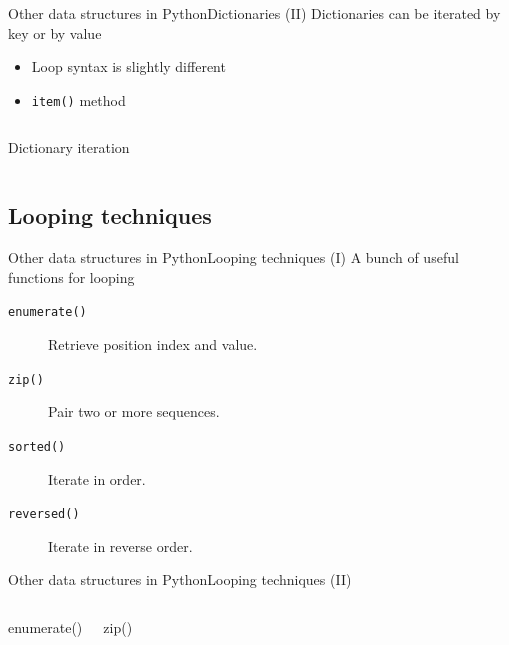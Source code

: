 \documentclass[10pt,compress]{beamer} %
\begin{document}
\begin{frame}{Other data structures in Python}{Dictionaries (II)}
	Dictionaries can be iterated by key or by value
		\begin{itemize}
		\item Loop syntax is slightly different
		\item \texttt{item()} method
		\end{itemize}

    \begin{columns}
		\begin{block}{Dictionary iteration}
		\vspace{-0.2cm}
		
		\vspace{-0.2cm}
		\end{block}
	\end{columns}
\end{frame}

\subsection{Looping techniques}
\begin{frame}{Other data structures in Python}{Looping techniques (I)}
	A bunch of useful functions for looping
		\begin{description}
		\item[\texttt{enumerate()}] Retrieve position index and value.
		\item[\texttt{zip()}] Pair two or more sequences.
		\item[\texttt{sorted()}] Iterate in order.
		\item[\texttt{reversed()}] Iterate in reverse order.
		\end{description}
\end{frame}

\begin{frame}{Other data structures in Python}{Looping techniques (II)}
    \begin{columns}
 	   \column{\textwidth}
		\begin{block}{enumerate()}
		\vspace{-0.2cm}
		
		\vspace{-0.2cm}
		\end{block}

		\begin{block}{zip()}
		\vspace{-0.2cm}
		
		\vspace{-0.2cm}
		\end{block}

	\end{columns}
\end{frame}
\end{document}
